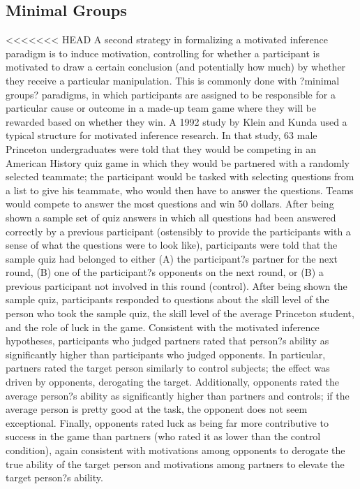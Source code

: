 \documentclass{article}
\begin{document}
\subsection{Minimal Groups}
<<<<<<< HEAD
A second strategy in formalizing a motivated inference paradigm is to induce motivation, controlling for whether a participant is motivated to draw a certain conclusion (and potentially how much) by whether they receive a particular manipulation. This is commonly done with ?minimal groups? paradigms, in which participants are assigned to be responsible for a particular cause or outcome in a made-up team game where they will be rewarded based on whether they win. A 1992 study by Klein and Kunda used a typical structure for motivated inference research. In that study, 63 male Princeton undergraduates were told that they would be competing in an American History quiz game in which they would be partnered with a randomly selected teammate; the participant would be tasked with selecting questions from a list to give his teammate, who would then have to answer the questions. Teams would compete to answer the most questions and win 50 dollars. After being shown a sample set of quiz answers in which all questions had been answered correctly by a previous participant (ostensibly to provide the participants with a sense of what the questions were to look like), participants were told that the sample quiz had belonged to either (A) the participant?s partner for the next round, (B) one of the participant?s opponents on the next round, or (B) a previous participant not involved in this round (control). After being shown the sample quiz, participants responded to questions about the skill level of the person who took the sample quiz, the skill level of the average Princeton student, and the role of luck in the game. 
Consistent with the motivated inference hypotheses, participants who judged partners rated that person?s ability as significantly higher than participants who judged opponents. In particular, partners rated the target person similarly to control subjects; the effect was driven by opponents, derogating the target. Additionally, opponents rated the average person?s ability as significantly higher than partners and controls; if the average person is pretty good at the task, the opponent does not seem exceptional. Finally, opponents rated luck as being far more contributive to success in the game than partners (who rated it as lower than the control condition), again consistent with motivations among opponents to derogate the true ability of the target person and motivations among partners to elevate the target person?s ability.  
\end{document}
